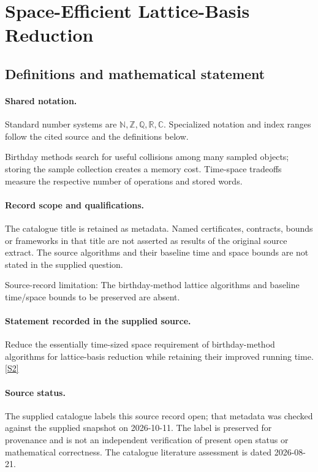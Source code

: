 \documentclass[11pt]{article}
\newcommand{\sref}[2]{\hyperlink{source:#1:#2}{[S#2]}}
\begin{document}
\section{Space-Efficient Lattice-Basis Reduction}\label{statement}

\subsection{Definitions and mathematical statement}

\paragraph{Shared notation.}Standard number systems are $\mathbb N,\mathbb Z,\mathbb Q,\mathbb R,\mathbb C$. Specialized notation and index ranges follow the cited source and the definitions below.


Birthday methods search for useful collisions among many sampled objects; storing the sample collection creates a memory cost. Time-space tradeoffs measure the respective number of operations and stored words.
\paragraph{Record scope and qualifications.}
The catalogue title is retained as metadata. Named certificates, contracts, bounds or frameworks in that title are not asserted as results of the original source extract.
The source algorithms and their baseline time and space bounds are not stated in the supplied question.

Source-record limitation: The birthday-method lattice algorithms and baseline time/space bounds to be preserved are absent.
\paragraph{Statement recorded in the supplied source.}
Reduce the essentially time-sized space requirement of birthday-method algorithms for lattice-basis reduction while retaining their improved running time. \sref{statement}{2}
\paragraph{Source status.}
The supplied catalogue labels this source record open; that metadata was checked against the supplied snapshot on 2026-10-11. The label is preserved for provenance and is not an independent verification of present open status or mathematical correctness. The catalogue literature assessment is dated 2026-08-21.
\end{document}
